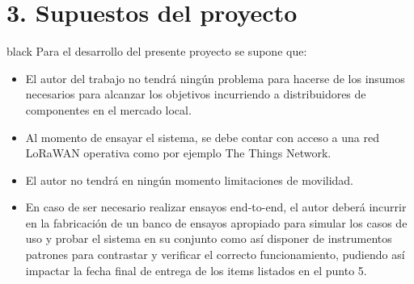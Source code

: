 \documentclass[11pt]{charter}
\begin{document}
\section{3. Supuestos del proyecto}
\label{sec:supuestos}
\begin{consigna}{black}
Para el desarrollo del presente proyecto se supone que:
\begin{itemize}
\item El autor del trabajo no tendrá ningún problema para hacerse de los insumos necesarios para alcanzar los objetivos incurriendo a distribuidores de componentes en el mercado local.
\item Al momento de ensayar el sistema, se debe contar con acceso a una red LoRaWAN operativa como por ejemplo The Things Network.
\item El autor no tendrá en ningún momento limitaciones de movilidad.
\item En caso de ser necesario realizar ensayos end-to-end, el autor deberá incurrir en la fabricación de un banco de ensayos apropiado para simular los casos de uso y probar el sistema en su conjunto como así disponer de instrumentos patrones para contrastar y verificar el correcto funcionamiento, pudiendo así impactar la fecha final de entrega de los items listados en el punto 5.
\end{itemize}

\end{consigna}
\end{document}
